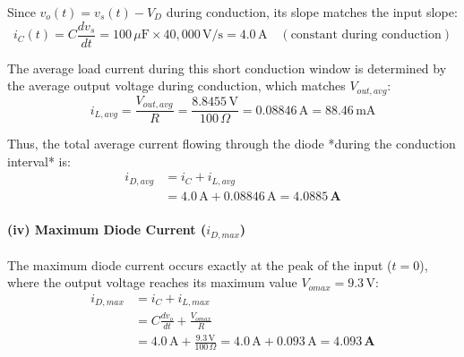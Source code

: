 \documentclass[12pt,a3paper]{article}
\begin{document}
\begin{enumerate}
\begin{tcolorbox}[enhanced,breakable,ansbox,colback=cA!4,colframe=cA,boxrule=0.8pt,arc=5pt,title={\textbf{Answer}},fonttitle=\bfseries\color{white},colbacktitle=cA]
Since $v_o(t) = v_s(t) - V_D$ during conduction, its slope matches the input slope:
\begin{equation*}
    i_C(t) = C\frac{dv_s}{dt} = 100\,\mu\text{F} \times 40,000\,\text{V/s} = 4.0\,\text{A} \quad (\text{constant during conduction})
\end{equation*}

The average load current during this short conduction window is determined by the average output voltage during conduction, which matches $V_{out,avg}$:
\begin{equation*}
    i_{L,avg} = \frac{V_{out,avg}}{R} = \frac{8.8455\,\text{V}}{100\,\Omega} = 0.08846\,\text{A} = 88.46\,\text{mA}
\end{equation*}

Thus, the total average current flowing through the diode *during the conduction interval* is:
\begin{align*}
    i_{D,avg} &= i_C + i_{L,avg} \\
    &= 4.0\,\text{A} + 0.08846\,\text{A} = \mathbf{4.0885\,\text{A}}
\end{align*}

\paragraph{(iv) Maximum Diode Current ($i_{D,max}$)}
The maximum diode current occurs exactly at the peak of the input ($t = 0$), where the output voltage reaches its maximum value $V_{omax} = 9.3\,\text{V}$:
\begin{align*}
    i_{D,max} &= i_C + i_{L,max} \\
    &= C\frac{dv_o}{dt} + \frac{V_{omax}}{R} \\
    &= 4.0\,\text{A} + \frac{9.3\,\text{V}}{100\,\Omega} = 4.0\,\text{A} + 0.093\,\text{A} = \mathbf{4.093\,\text{A}}
\end{align*}

\vspace{0.5em}
\hrulefill
\vspace{0.5em}


\end{tcolorbox}
\end{enumerate}
\end{document}

